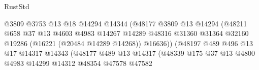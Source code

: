 \begin{lexlean}{RustStd}
\begin{coremodule}
                                              @3809
                                              @3753
                                              @13
                                              @18
                                              @14294
                                              @14344
                                              (@48177
                                                @3809
                                                @13
                                                @14294
                                                (@48211
                                                  @658
                                                  @37
                                                  @13
                                                  @4603
                                                  @4983
                                                  @14267
                                                  @14289
                                                  @48316
                                                  @31360
                                                  @31364
                                                  @32160
                                                  @19286
                                                  (@16221 (@20484 @14289 @14268))
                                                  @16636))
                                              (@48197
                                                @489
                                                @496
                                                @13
                                                @17
                                                @14317
                                                @14343
                                                (@48177
                                                  @489
                                                  @13
                                                  @14317
                                                  (@48339
                                                    @175
                                                    @37
                                                    @13
                                                    @4800
                                                    @4983
                                                    @14299
                                                    @14312
                                                    @48354
                                                    @47578
                                                    @47582

\end{coremodule}
\end{lexlean}
